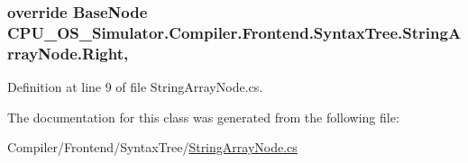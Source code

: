 \subsubsection[{Right}]{\setlength{\rightskip}{0pt plus 5cm}override {\bf Base\+Node} C\+P\+U\+\_\+\+O\+S\+\_\+\+Simulator.\+Compiler.\+Frontend.\+Syntax\+Tree.\+String\+Array\+Node.\+Right\hspace{0.3cm}{\ttfamily [get]}, {\ttfamily [set]}}\label{class_c_p_u___o_s___simulator_1_1_compiler_1_1_frontend_1_1_syntax_tree_1_1_string_array_node_a736bb824c3e207f918237e1fdde209e7}


Definition at line 9 of file String\+Array\+Node.\+cs.



The documentation for this class was generated from the following file\+:\begin{DoxyCompactItemize}
\item 
Compiler/\+Frontend/\+Syntax\+Tree/\hyperlink{_string_array_node_8cs}{String\+Array\+Node.\+cs}\end{DoxyCompactItemize}
